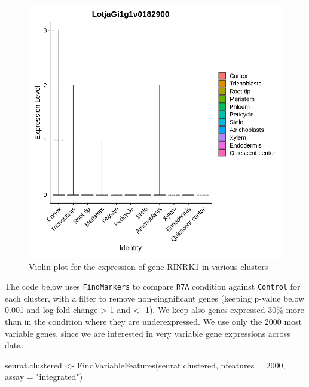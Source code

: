 \documentclass[
  letterpaper,
  DIV=11,
  numbers=noendperiod]{scrartcl}
\newenvironment{Shaded}{\begin{snugshade}}{\end{snugshade}}
\newcommand{\AttributeTok}[1]{\textcolor[rgb]{0.49,0.56,0.16}{#1}}
\newcommand{\DecValTok}[1]{\textcolor[rgb]{0.25,0.63,0.44}{#1}}
\newcommand{\FunctionTok}[1]{\textcolor[rgb]{0.02,0.16,0.49}{#1}}
\newcommand{\NormalTok}[1]{\textcolor[rgb]{0.00,0.44,0.13}{#1}}
\newcommand{\OtherTok}[1]{\textcolor[rgb]{0.00,0.44,0.13}{#1}}
\newcommand{\StringTok}[1]{\textcolor[rgb]{0.25,0.44,0.63}{#1}}
\begin{document}
\begin{figure}[H]

{\centering \includegraphics{notebook_files/figure-pdf/fig-vln-output-1.png}

}

\caption{\label{fig-vln}Violin plot for the expression of gene RINRK1 in
various clusters}

\end{figure}

The code below uses \texttt{FindMarkers} to compare \texttt{R7A}
condition against \texttt{Control} for each cluster, with a filter to
remove non-singnificant genes (keeping p-value below 0.001 and log fold
change \textgreater{} 1 and \textless{} -1). We keep also genes
expressed 30\% more than in the condition where they are underexpressed.
We use only the 2000 most variable genes, since we are interested in
very variable gene expressions across data.

\begin{Shaded}
\begin{Highlighting}[]
\NormalTok{seurat.clustered }\OtherTok{\textless{}{-}} \FunctionTok{FindVariableFeatures}\NormalTok{(seurat.clustered, }\AttributeTok{nfeatures =} \DecValTok{2000}\NormalTok{, }\AttributeTok{assay =} \StringTok{"integrated"}\NormalTok{)}
\end{Highlighting}
\end{Shaded}
\end{document}
